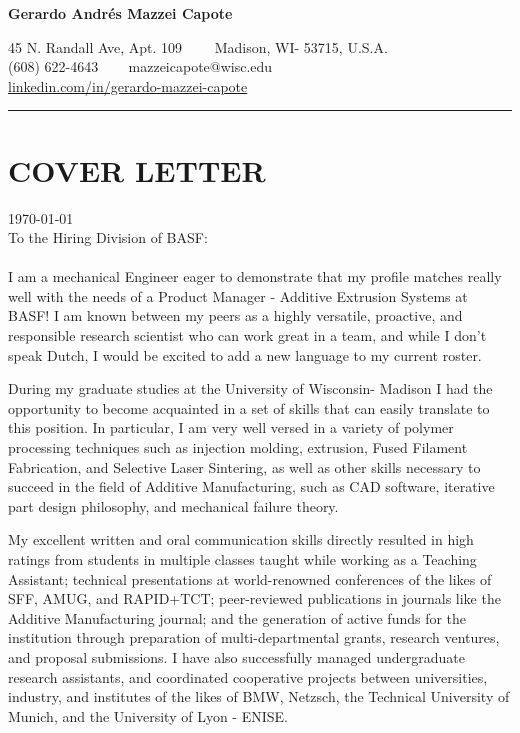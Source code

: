 \documentclass[12pt,letterpaper]{article}
\begin{document}
\begin{center}
	{\LARGE \textbf{Gerardo Andrés Mazzei Capote}}

	45 N. Randall Ave, Apt. 109\ \ \textbullet
	\ \ Madison, WI- 53715, U.S.A.
	\\
	(608) 622-4643 \ \textbullet
	\ \ mazzeicapote@wisc.edu\\
	\href{https://www.linkedin.com/in/gerardo-mazzei-capote}{linkedin.com/in/gerardo-mazzei-capote}
	
\end{center}
\vspace{-0.5em}
\hrule
\vspace{0.4em}
\vspace{-1em}

\section*{COVER LETTER}
\vspace{0.4em}
\today
\\
To the Hiring Division of BASF:
\\
\\
I am a mechanical Engineer eager to demonstrate that my profile matches really well with the needs of a Product Manager - Additive Extrusion Systems at BASF! I am known between my peers as a highly versatile, proactive, and responsible research scientist who can work great in a team, and while I don't speak Dutch, I would be excited to add a new language to my current roster.

During my graduate studies at the University of Wisconsin- Madison I had the opportunity to become acquainted in a set of skills that can easily translate to this position. In particular, I am very well versed in a variety of polymer processing techniques such as injection molding, extrusion, Fused Filament Fabrication, and Selective Laser Sintering, as well as other skills necessary to succeed in the field of Additive Manufacturing, such as CAD software, iterative part design philosophy, and mechanical failure theory.  

My excellent written and oral communication skills directly resulted in high ratings from students in multiple classes taught while working as a Teaching Assistant; technical presentations at world-renowned conferences of the likes of SFF, AMUG, and RAPID+TCT; peer-reviewed publications in journals like the Additive Manufacturing journal; and the generation of active funds for the institution through preparation of multi-departmental grants, research ventures, and proposal submissions. I have also successfully managed undergraduate research assistants, and coordinated cooperative projects between universities, industry, and institutes of the likes of BMW, Netzsch, the Technical University of Munich, and the University of Lyon - ENISE.
\end{document}
